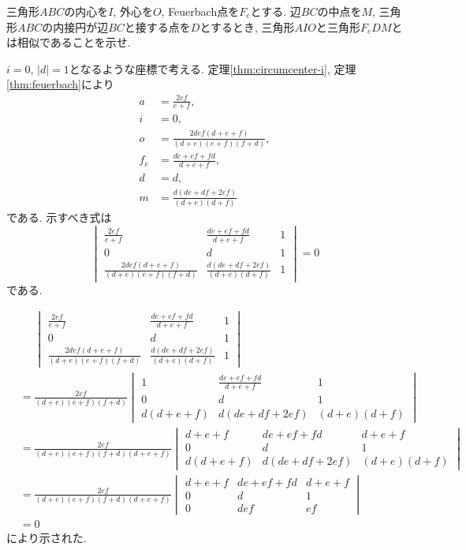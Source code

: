 \begin{bprb}
三角形$ABC$の内心を$I$, 外心を$O$, Feuerbach点を$F_e$とする.
辺$BC$の中点を$M$, 三角形$ABC$の内接円が辺$BC$と接する点を$D$とするとき, 三角形$AIO$と三角形$F_eDM$とは相似であることを示せ.
\end{bprb}
\begin{ifsol*}
$i=0$, $\lvert d\rvert=1$となるような座標で考える.
定理\ref{thm:circumcenter-i}, 定理\ref{thm:feuerbach}により
\begin{align*}
a&=\frac{2ef}{e+f},\\
i&=0,\\
o&=\frac{2def(d+e+f)}{(d+e)(e+f)(f+d)},\\
f_e&=\frac{de+ef+fd}{d+e+f},\\
d&=d,\\
m&=\frac{d(de+df+2ef)}{(d+e)(d+f)}
\end{align*}
である.
示すべき式は
\[\begin{vmatrix}
\frac{2ef}{e+f}&\frac{de+ef+fd}{d+e+f}&1\\
0&d&1\\
\frac{2def(d+e+f)}{(d+e)(e+f)(f+d)}&\frac{d(de+df+2ef)}{(d+e)(d+f)}&1
\end{vmatrix}=0\]
である.

\begin{align*}
&\phantom{={}}\begin{vmatrix}
\frac{2ef}{e+f}&\frac{de+ef+fd}{d+e+f}&1\\
0&d&1\\
\frac{2def(d+e+f)}{(d+e)(e+f)(f+d)}&\frac{d(de+df+2ef)}{(d+e)(d+f)}&1
\end{vmatrix}\\
&=\frac{2ef}{(d+e)(e+f)(f+d)}\begin{vmatrix}
1&\frac{de+ef+fd}{d+e+f}&1\\
0&d&1\\
d(d+e+f)&d(de+df+2ef)&(d+e)(d+f)
\end{vmatrix}\\
&=\frac{2ef}{(d+e)(e+f)(f+d)(d+e+f)}\begin{vmatrix}
d+e+f&de+ef+fd&d+e+f\\
0&d&1\\
d(d+e+f)&d(de+df+2ef)&(d+e)(d+f)
\end{vmatrix}\\
&=\frac{2ef}{(d+e)(e+f)(f+d)(d+e+f)}\begin{vmatrix}
d+e+f&de+ef+fd&d+e+f\\
0&d&1\\
0&def&ef
\end{vmatrix}\\
&=0
\end{align*}
により示された.
\end{ifsol*}
